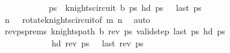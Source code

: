 \begin{isabellebody}
\ \ \ \ \ \ \ \ \isamarkupfalse%
\ \isamarkupfalse%
\ ps\ \ {\isachardoublequoteopen}knights{\isacharunderscore}{\kern0pt}circuit\ {\isacharquery}{\kern0pt}b\ ps\ {\isachardoublequoteopen}hd\ ps\ {\isacharequal}{\kern0pt}\ {\isacharparenleft}{\kern0pt}{}{\isacharcomma}{\kern0pt}{}{\isacharparenright}{\kern0pt}{\isachardoublequoteclose}\ {\isachardoublequoteopen}last\ ps\ {\isacharequal}{\kern0pt}\ {\isacharparenleft}{\kern0pt}{}{\isacharcomma}{\kern0pt}{}{\isacharparenright}{\kern0pt}{\isachardoublequoteclose}\isanewline
\ \ \ \ \ \ \ \ \ \ \isamarkupfalse%
\ {\isacartoucheopen}n{\isacharminus}{\kern0pt}{}\ {\isasymge}\ {}{\isacartoucheclose}\ rotate{\isacharunderscore}{\kern0pt}knights{\isacharunderscore}{\kern0pt}circuit{\isacharbrackleft}{\kern0pt}of\ m\ {\isachardoublequoteopen}n{\isacharminus}{\kern0pt}{}{\isachardoublequoteclose}{\isacharbrackright}{\kern0pt}\ \isamarkupfalse%
\ auto\isanewline
\ \ \ \ \ \ \ \ \isamarkupfalse%
\ \isamarkupfalse%
\ rev{\isacharunderscore}{\kern0pt}psprems{\isacharcolon}{\kern0pt}\ {\isachardoublequoteopen}knights{\isacharunderscore}{\kern0pt}path\ {\isacharquery}{\kern0pt}b\ {\isacharparenleft}{\kern0pt}rev\ ps\ {\isachardoublequoteopen}valid{\isacharunderscore}{\kern0pt}step\ {\isacharparenleft}{\kern0pt}last\ ps\ {\isacharparenleft}{\kern0pt}hd\ ps\isanewline
\ \ \ \ \ \ \ \ \ \ \ \ {\isachardoublequoteopen}hd\ {\isacharparenleft}{\kern0pt}rev\ ps\ {\isacharequal}{\kern0pt}\ {\isacharparenleft}{\kern0pt}{}{\isacharcomma}{\kern0pt}{}{\isacharparenright}{\kern0pt}{\isachardoublequoteclose}\ {\isachardoublequoteopen}last\ {\isacharparenleft}{\kern0pt}rev\ ps\ {\isacharequal}{\kern0pt}\ {\isacharparenleft}{\kern0pt}{}{\isacharcomma}{\kern0pt}{}{\isacharparenright}{\kern0pt}{\isachardoublequoteclose}\isanewline

\end{isabellebody}
